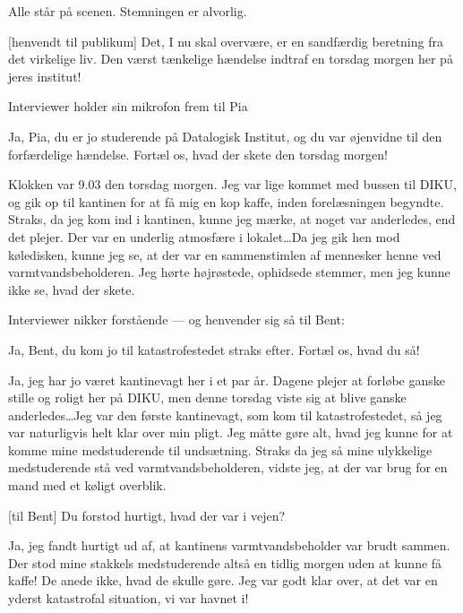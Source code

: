 \documentclass[a4paper,11pt]{article}
\begin{document}
\begin{sketch}
\scene
Alle står på scenen. Stemningen er alvorlig.

[henvendt til publikum]
     Det, I nu skal overvære, er en sandfærdig beretning
     fra det virkelige liv. Den værst tænkelige hændelse
     indtraf en torsdag morgen her på jeres institut!

\scene
Interviewer holder sin mikrofon frem til Pia

Ja, Pia, du er jo studerende på Datalogisk Institut,
     og du var øjenvidne til den forfærdelige hændelse.
     Fortæl os, hvad der skete den torsdag morgen!

Klokken var 9.03 den torsdag morgen. Jeg var lige
     kommet med bussen til DIKU, og gik op til kantinen for
     at få mig en kop kaffe, inden forelæsningen begyndte. 
     Straks, da jeg kom ind i kantinen, kunne jeg mærke, at
     noget var anderledes, end det plejer. Der var en
     underlig atmosfære i lokalet\dots Da jeg gik hen mod
     køledisken, kunne jeg se, at der var en sammenstimlen
     af mennesker henne ved varmtvandsbeholderen. Jeg hørte 
     højrøstede, ophidsede stemmer, men jeg kunne ikke se, 
     hvad der skete.

\scene Interviewer nikker forstående --- og henvender sig så til
Bent:

 Ja, Bent, du kom jo til katastrofestedet straks efter.
     Fortæl os, hvad du så!

     Ja, jeg har jo været kantinevagt her i et par år.
     Dagene plejer at forløbe ganske stille og roligt her
     på DIKU, men denne torsdag viste sig at blive ganske
     anderledes\dots Jeg var den første kantinevagt, som kom
     til katastrofestedet, så jeg var naturligvis helt klar
     over min pligt. Jeg måtte gøre alt, hvad jeg kunne for
     at komme mine medstuderende til undsætning. Straks da
     jeg så mine ulykkelige medstuderende stå ved
     varmtvandsbeholderen, vidste jeg, at der var brug for en
     mand med et køligt overblik.    

[til Bent]
     Du forstod hurtigt, hvad der var i vejen?

     Ja, jeg fandt hurtigt ud af, at kantinens
     varmtvandsbeholder var brudt sammen. Der stod mine
     stakkels medstuderende altså en tidlig morgen uden at
     kunne få kaffe! De anede ikke, hvad de skulle gøre.
     Jeg var godt klar over, at det var en yderst katastrofal
     situation, vi var havnet i!


\end{sketch}
\end{document}
